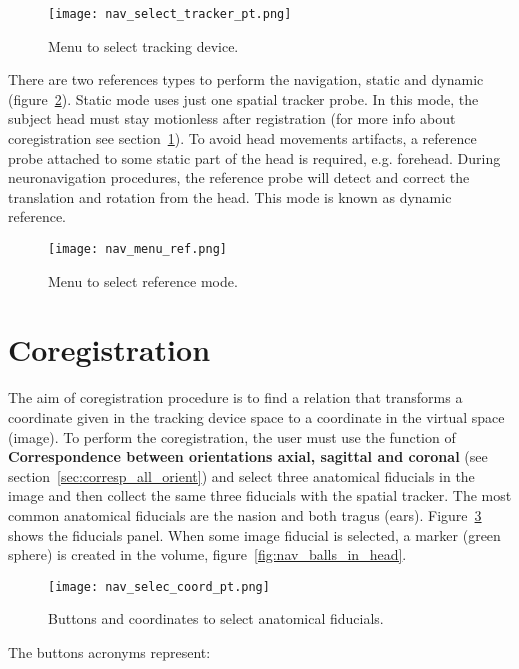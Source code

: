 \begin{figure}[!htb]
\centering
\texttt{[image: nav\_select\_tracker\_pt.png]}
\caption{Menu to select tracking device.}
\label{fig:nav_select_tracker}
\end{figure}

There are two references types to perform the navigation, static and dynamic (figure~\ref{fig:nav_menu_ref}).
Static mode uses just one spatial tracker probe. In this mode, the subject head must stay motionless after
registration (for more info about coregistration see section~\ref{sec:corregistro}). To avoid head movements artifacts,
a reference probe attached to some static part of the head is required, e.g. forehead. During neuronavigation
procedures, the reference probe will detect and correct the translation and rotation from the head.
This mode is known as dynamic reference.

\begin{figure}[!htb]
\centering
\texttt{[image: nav\_menu\_ref.png]}
\caption{Menu to select reference mode.}
\label{fig:nav_menu_ref}
\end{figure}

\section{Coregistration}
\label{sec:corregistro}

The aim of coregistration procedure is to find a relation that transforms a coordinate given in the tracking device space
to a coordinate in the virtual space (image). To perform the coregistration, the user must
use the function of \textbf{Correspondence between orientations axial, sagittal and coronal} (see section~\ref{sec:corresp_all_orient})
and select three anatomical fiducials in the image and then collect the same three fiducials with the spatial tracker.
The most common anatomical fiducials are the nasion and both tragus (ears). Figure~\ref{fig:nav_selec_coord} shows the fiducials panel.
When some image fiducial is selected, a marker (green sphere) is created in the volume, figure~\ref{fig:nav_balls_in_head}.

\begin{figure}[!htb]
\centering
\texttt{[image: nav\_selec\_coord\_pt.png]}
\caption{Buttons and coordinates to select anatomical fiducials.}
\label{fig:nav_selec_coord}
\end{figure}

The buttons acronyms represent:

